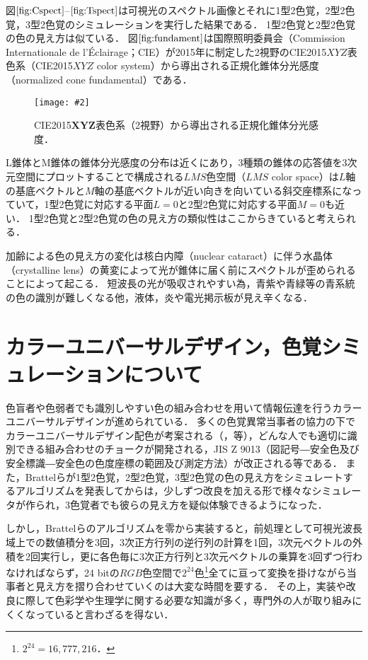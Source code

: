 \documentclass[uplatex,paper=a4,fontsize=4.0truemm,jafontsize=4.0truemm,head_space=30.0truemm,baselineskip=8.0truemm,gutter=25.0truemm,oneside,fleqn,hanging_panctuation,open_bracket_pos=nibu_tentsuki,dvipdfmx,jis2004,book,titlepage]{jlreq}
\theoremstyle{mystyle}
\newcommand{\figureinput}[4]{\begin{figure}[tbp]\centering\texttt{[image: \#2]}\caption{#3．}\label{fig:#4}\end{figure}}
\newcommand{\mathdisplaystyle}[1]{\(\displaystyle{#1}\)}
\newcommand{\Reference}[1]{\mathdisplaystyle{\ref{#1}}}
\begin{document}
			図\Reference{fig:Cspect}--\Reference{fig:Tspect}は可視光のスペクトル画像とそれに1型2色覚，2型2色覚，3型2色覚のシミュレーションを実行した結果である．
			1型2色覚と2型2色覚の色の見え方は似ている．
			図\Reference{fig:fundament}は国際照明委員会（Commission Internationale de l'Éclairage；CIE）が2015年に制定した2\textdegree 視野のCIE2015\mathdisplaystyle{XYZ}表色系（CIE2015\mathdisplaystyle{XYZ} color system）から導出される正規化錐体分光感度（normalized cone fundamental）である．
			\figureinput{width=\linewidth}{D:/a/figs/ConeFundamental.png}{CIE2015\mathdisplaystyle{\bm{XYZ}}表色系（2\textdegree 視野）から導出される正規化錐体分光感度}{fundament}
			L錐体とM錐体の錐体分光感度の分布は近くにあり，3種類の錐体の応答値を3次元空間にプロットすることで構成される\mathdisplaystyle{LMS}色空間（\mathdisplaystyle{LMS} color space）は\mathdisplaystyle{L}軸の基底ベクトルと\mathdisplaystyle{M}軸の基底ベクトルが近い向きを向いている斜交座標系になっていて，1型2色覚に対応する平面\mathdisplaystyle{L=0}と2型2色覚に対応する平面\mathdisplaystyle{M=0}も近い．
			1型2色覚と2型2色覚の色の見え方の類似性はここからきていると考えられる．

			加齢による色の見え方の変化は核白内障（nuclear cataract）に伴う水晶体（crystalline lens）の黄変によって光が錐体に届く前にスペクトルが歪められることによって起こる．
			短波長の光が吸収されやすい為，青紫や青緑等の青系統の色の識別が難しくなる他，液体，炎や電光掲示板が見え辛くなる\cite{Ishihara1998}．
		\section{カラーユニバーサルデザイン，色覚シミュレーションについて}
			色盲者や色弱者でも識別しやすい色の組み合わせを用いて情報伝達を行うカラーユニバーサルデザインが進められている．
			多くの色覚異常当事者の協力の下でカラーユニバーサルデザイン配色が考案される（\cite[pp.~1091--1099]{Okabe2002c}，\cite{cudo2018}等），どんな人でも適切に識別できる組み合わせのチョークが開発される\cite{Rikagaku2020}，JIS Z 9013（図記号―安全色及び安全標識―安全色の色度座標の範囲及び測定方法）が改正される\cite{Nakano2018}等である．
			また，Brattelらが1型2色覚，2型2色覚，3型2色覚の色の見え方をシミュレートするアルゴリズムを発表\cite{Brettel1997}してからは，少しずつ改良を加える形で様々なシミュレータが作られ，3色覚者でも彼らの見え方を疑似体験できるようになった．

			しかし，Brattelらのアルゴリズムを零から実装すると，前処理として可視光波長域上での数値積分を3回，3次正方行列の逆行列の計算を1回，3次元ベクトルの外積を2回実行し，更に各色毎に3次正方行列と3次元ベクトルの乗算を3回ずつ行わなければならず，24 bitの\mathdisplaystyle{RGB}色空間で\mathdisplaystyle{2^{24}}色\footnote{\mathdisplaystyle{2^{24}=16{,}777{,}216}．}全てに亘って変換を掛けながら当事者と見え方を摺り合わせていくのは大変な時間を要する．
			その上，実装や改良に際して色彩学や生理学に関する必要な知識が多く，専門外の人が取り組みにくくなっていると言わざるを得ない．
\end{document}
